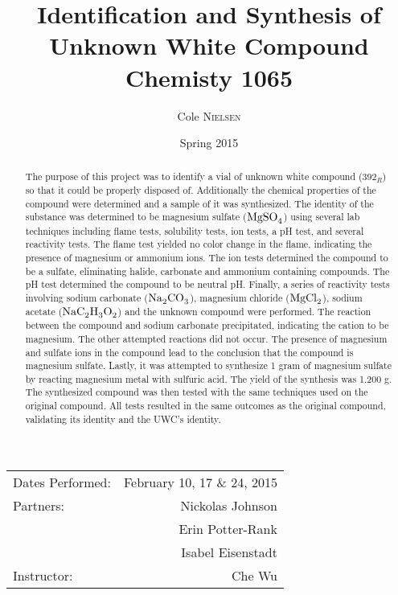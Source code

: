 \documentclass[12pt]{article}
\title{Identification and Synthesis of \\  Unknown White Compound \\ \vspace{0.3 in} Chemisty 1065} %
\author{Cole \textsc{Nielsen}} %
\date{Spring 2015} %
\begin{document}
\maketitle %

\begin{center}
\begin{tabular}{l r}
Dates Performed: & February 10, 17 \& 24, 2015 \\ %
Partners: & Nickolas Johnson \\ %
& Erin Potter-Rank \\
& Isabel Eisenstadt \\
Instructor: & Che Wu %
\end{tabular}
\end{center}

\pagebreak
 \begin{abstract}\doublespacing
The purpose of this project was to identify a vial of unknown white compound (\(392_R\)) so that it could be properly disposed of. Additionally the chemical properties of the compound were determined and a sample of it was synthesized. The identity of the substance was determined to be magnesium sulfate (\(\ce{MgSO4}\)) using several lab techniques including flame tests, solubility tests, ion tests, a pH test, and several reactivity tests. The flame test yielded no color change in the flame, indicating the presence of magnesium or ammonium ions. The ion tests determined the compound to be a sulfate, eliminating halide, carbonate and ammonium containing compounds. The pH test determined the compound to be neutral pH. Finally, a series of reactivity tests involving sodium carbonate (\(\ce{Na2CO3}\)), magnesium chloride (\(\ce{MgCl2}\)), sodium acetate (\(\ce{NaC2H3O2}\)) and the unknown compound were performed. The reaction between the compound and sodium carbonate precipitated, indicating the cation to be magnesium. The other attempted reactions did not occur. The presence of magnesium and sulfate ions in the compound lead to the conclusion that the compound is magnesium sulfate. Lastly, it was attempted to synthesize 1 gram of magnesium sulfate by reacting magnesium metal with sulfuric acid. The yield of the synthesis was 1.200 g. The synthesized compound was then tested with the same techniques used on the original compound. All tests resulted in the same outcomes as the original compound, validating its identity and the UWC's identity. 
 \end{abstract}
\end{document}
